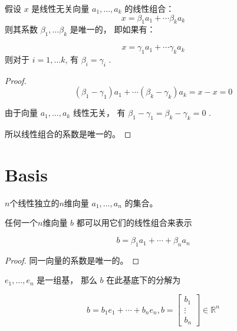 \begin{theorem}
    假设 $ x $ 是线性无关向量 $ a_{1}, \ldots, a_{k} $ 的线性组合：
\begin{equation}
x=\beta_{1} a_{1}+\cdots \beta_{k} a_{k}
\end{equation}
则其系数 $ \beta_{1}, \ldots \beta_{k} $ 是唯一的， 即如果有：

\begin{equation}
x=\gamma_{1} a_{1}+\cdots \gamma_{k} a_{k}
\end{equation}
则对于 $ i=1, \ldots k $, 有 $ \beta_{i}=\gamma_{i} $ . 
\end{theorem}

\begin{proof}
\begin{equation}
\left(\beta_{1}-\gamma_{1}\right) a_{1}+\cdots\left(\beta_{k}-\gamma_{k}\right) a_{k}=x-x=0
\end{equation}

由于向量 $ a_{1}, \ldots, a_{k} $ 线性无关， 有 $ \beta_{1}-\gamma_{1}=\beta_{k}-\gamma_{k}=0 $ . 

所以线性组合的系数是唯一的。
\end{proof}

\section{Basis}

\begin{definition}[基 (Basis)]
    $n$个线性独立的$n$维向量 $ a_{1}, \ldots, a_{n} $ 的集合。
\end{definition}

\begin{definition}
    任何一个$n$维向量 $ b $ 都可以用它们的线性组合来表示

\begin{equation}
b=\beta_{1} a_{1}+\cdots+\beta_{n} a_{n}
\end{equation}
\end{definition}

\begin{proof}
    同一向量的系数是唯一的。 
\end{proof}

\begin{example}
    $ e_{1}, \ldots, e_{n} $ 是一组基， 那么 $ b $ 在此基底下的分解为

    \begin{equation} b=b_{1} e_{1}+\cdots+b_{n} e_{n} ,b=\left[\begin{array}{c}b_{1} \\ \vdots \\ b_{n}\end{array}\right] \in \mathbb{R}^{n} \end{equation}
\end{example}

